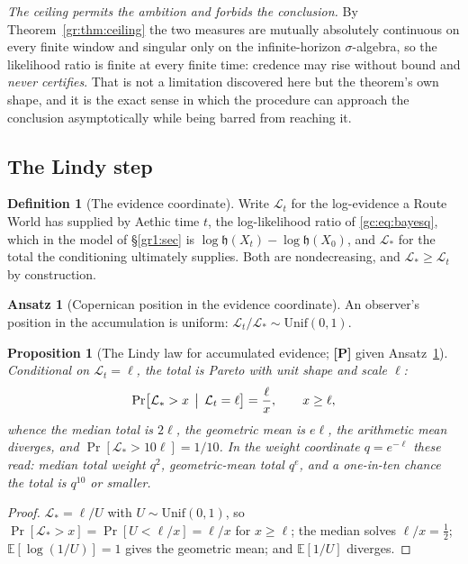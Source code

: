 \documentclass[11pt]{article}
\numberwithin{equation}{section}
\theoremstyle{plain}
\newtheorem{proposition}[theorem]{Proposition}
\theoremstyle{definition}
\newtheorem{definition}[theorem]{Definition}
\newtheorem{ansatz}[theorem]{Ansatz}
\theoremstyle{remark}
\newcommand{\E}{\mathbb{E}}
\newcommand{\Lc}{\mathcal{L}}
\newcommand{\hm}{\mathfrak{h}}
\begin{document}
\emph{The ceiling permits the ambition and forbids the conclusion.} By
Theorem~\ref{gr:thm:ceiling} the two measures are mutually absolutely
continuous on every finite window and singular only on the
infinite-horizon $\sigma$-algebra, so the likelihood ratio is finite at
every finite time: credence may rise without bound and \emph{never
certifies}. That is not a limitation discovered here but the theorem's
own shape, and it is the exact sense in which the procedure can approach
the conclusion asymptotically while being barred from reaching it.

\subsection{The Lindy step}\label{gc:sub:lindy}

\begin{definition}[The evidence coordinate]\label{gc:def:evidence}
Write $\Lc_t$ for the log-evidence a Route World has supplied by Aethic
time $t$, the log-likelihood ratio of \eqref{gc:eq:bayesq}, which in
the model of \S\ref{gr1:sec} is $\log\hm(X_t)-\log\hm(X_0)$, and
$\Lc_\ast$ for the total the conditioning ultimately supplies. Both are
nondecreasing, and $\Lc_\ast\ge\Lc_t$ by construction.
\end{definition}

\begin{ansatz}[Copernican position in the evidence coordinate]
\label{gc:ans:copernican}
An observer's position in the accumulation is uniform:
$\Lc_t/\Lc_\ast\sim\mathrm{Unif}(0,1)$.
\end{ansatz}

\begin{proposition}[The Lindy law for accumulated evidence;
\textbf{[P]} given Ansatz~\ref{gc:ans:copernican}]\label{gc:prop:lindy}
Conditional on $\Lc_t=\ell$, the total is Pareto with unit shape and
scale $\ell$:
\begin{equation}\label{gc:eq:lindylaw}
\Pr\bigl[\Lc_\ast>x\,\bigm|\,\Lc_t=\ell\bigr]=\frac{\ell}{x},
\qquad x\ge\ell,
\end{equation}
whence the median total is $2\ell$, the geometric mean is $e\ell$, the
arithmetic mean diverges, and $\Pr[\Lc_\ast>10\ell]=1/10$. In the
weight coordinate $q=e^{-\ell}$ these read: median total weight $q^{2}$,
geometric-mean total $q^{e}$, and a one-in-ten chance the total is
$q^{10}$ or smaller.
\end{proposition}

\begin{proof}
$\Lc_\ast=\ell/U$ with $U\sim\mathrm{Unif}(0,1)$, so
$\Pr[\Lc_\ast>x]=\Pr[U<\ell/x]=\ell/x$ for $x\ge\ell$; the median solves
$\ell/x=\tfrac12$; $\E[\log(1/U)]=1$ gives the geometric mean; and
$\E[1/U]$ diverges.
\end{proof}
\end{document}
